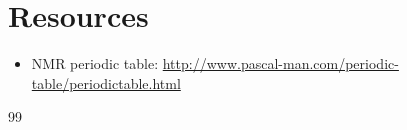 \documentclass[a4paper,11pt,twoside]{article}
\begin{document}
\section{Resources}
\begin{itemize}

\item NMR periodic table: \url{http://www.pascal-man.com/periodic-table/periodictable.html}

\end{itemize}


\begin{thebibliography}{99}
\bibitem{}
  

\end{thebibliography}

\end{document}
